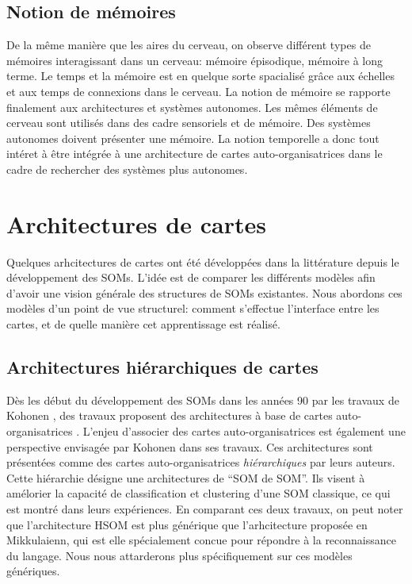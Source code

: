 \documentclass[../main]{subfiles}
\begin{document}
\subsection{Notion de mémoires}

De la même manière que les aires du cerveau, on observe différent types de mémoires interagissant dans un cerveau: mémoire épisodique, mémoire à long terme. Le temps et la mémoire est en quelque sorte spacialisé grâce aux échelles et aux temps de connexions dans le cerveau. 
La notion de mémoire se rapporte finalement aux architectures et systèmes autonomes. Les mêmes éléments de cerveau sont utilisés dans des cadre sensoriels et de mémoire. 
Des systèmes autonomes doivent présenter une mémoire. 
La notion temporelle a donc tout intéret à être intégrée à une architecture de cartes auto-organisatrices dans le cadre de rechercher des systèmes plus autonomes.


\section{Architectures de cartes}

Quelques arhcitectures de cartes ont été développées dans la littérature depuis le développement des SOMs.  L'idée est de comparer les différents modèles afin d'avoir une vision générale des structures de SOMs existantes. Nous abordons ces modèles d'un point de vue structurel: comment s'effectue l'interface entre les cartes, et de quelle manière cet apprentissage est réalisé. 

\subsection{Architectures hiérarchiques de cartes}

Dès les début du développement des SOMs dans les années 90 par les travaux de Kohonen \cite{Kohonen1982,Kohonen1995SelfOrganizingM}, des travaux proposent des architectures à base de cartes auto-organisatrices \cite{LampinenClusteringPO,miikkulainen_script_1992,ritter_combining_1989}. L'enjeu d'associer des cartes auto-organisatrices est également une perspective envisagée par Kohonen dans ses travaux.
Ces architectures sont présentées comme des cartes auto-organisatrices \emph{hiérarchiques} par leurs auteurs. 
Cette hiérarchie désigne une architectures de “SOM de SOM”.
Ils visent à amélorier la capacité de classification et clustering d'une SOM classique, ce qui est montré dans leurs expériences.
En comparant ces deux travaux, on peut noter que l'architecture HSOM est plus générique que l'arhcitecture proposée en Mikkulaienn, qui est elle spécialement concue pour répondre à la reconnaissance du langage. Nous nous attarderons plus spécifiquement sur ces modèles génériques.
\end{document}
